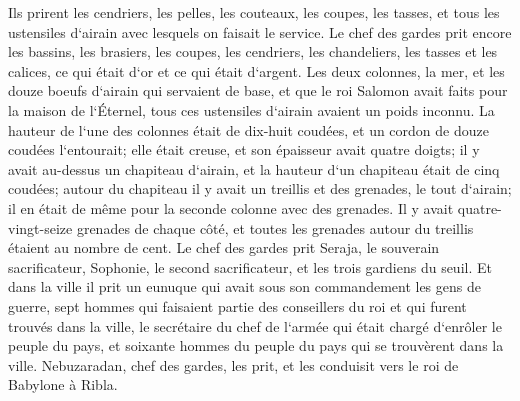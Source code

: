 \verse Ils prirent les cendriers, les pelles, les couteaux, les coupes, les tasses, et tous les ustensiles d`airain avec lesquels on faisait le service. 
\verse Le chef des gardes prit encore les bassins, les brasiers, les coupes, les cendriers, les chandeliers, les tasses et les calices, ce qui était d`or et ce qui était d`argent. 
\verse Les deux colonnes, la mer, et les douze boeufs d`airain qui servaient de base, et que le roi Salomon avait faits pour la maison de l`Éternel, tous ces ustensiles d`airain avaient un poids inconnu. 
\verse La hauteur de l`une des colonnes était de dix-huit coudées, et un cordon de douze coudées l`entourait; elle était creuse, et son épaisseur avait quatre doigts; 
\verse il y avait au-dessus un chapiteau d`airain, et la hauteur d`un chapiteau était de cinq coudées; autour du chapiteau il y avait un treillis et des grenades, le tout d`airain; il en était de même pour la seconde colonne avec des grenades. 
\verse Il y avait quatre-vingt-seize grenades de chaque côté, et toutes les grenades autour du treillis étaient au nombre de cent. 
\verse Le chef des gardes prit Seraja, le souverain sacrificateur, Sophonie, le second sacrificateur, et les trois gardiens du seuil. 
\verse Et dans la ville il prit un eunuque qui avait sous son commandement les gens de guerre, sept hommes qui faisaient partie des conseillers du roi et qui furent trouvés dans la ville, le secrétaire du chef de l`armée qui était chargé d`enrôler le peuple du pays, et soixante hommes du peuple du pays qui se trouvèrent dans la ville. 
\verse Nebuzaradan, chef des gardes, les prit, et les conduisit vers le roi de Babylone à Ribla. 
